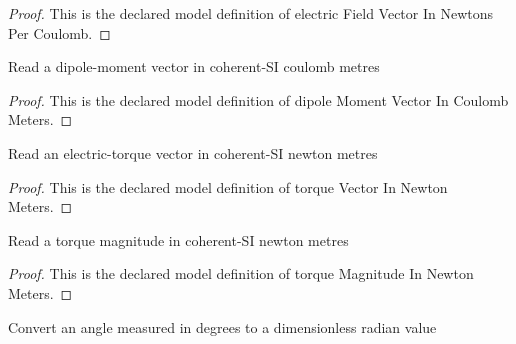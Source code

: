 \begin{proof}
  This is the declared model definition of electric Field Vector In Newtons Per Coulomb.
\end{proof}
\begin{definition}
  \label{def:physics:phyx-mini-0996:phyxminiproblems-problemphyxmini0996-dipolemomentvectorincoulombmeters}
  Read a dipole-moment vector in coherent-SI coulomb metres
\end{definition}
\begin{proof}
  This is the declared model definition of dipole Moment Vector In Coulomb Meters.
\end{proof}
\begin{definition}
  \label{def:physics:phyx-mini-0996:phyxminiproblems-problemphyxmini0996-torquevectorinnewtonmeters}
  Read an electric-torque vector in coherent-SI newton metres
\end{definition}
\begin{proof}
  This is the declared model definition of torque Vector In Newton Meters.
\end{proof}
\begin{definition}
  \label{def:physics:phyx-mini-0996:phyxminiproblems-problemphyxmini0996-torquemagnitudeinnewtonmeters}
  Read a torque magnitude in coherent-SI newton metres
\end{definition}
\begin{proof}
  This is the declared model definition of torque Magnitude In Newton Meters.
\end{proof}
\begin{definition}
  \label{def:physics:phyx-mini-0996:phyxminiproblems-problemphyxmini0996-degreestoradians}
  Convert an angle measured in degrees to a dimensionless radian value
\end{definition}
